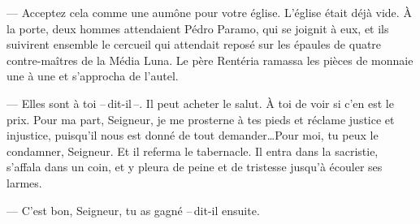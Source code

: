   --- Acceptez cela comme une aumône pour votre église.
\pend
%
\pstart
  L'église était déjà vide. À la porte, deux hommes attendaient Pédro Paramo, qui se joignit à eux, et ils suivirent ensemble le cercueil qui attendait reposé sur les épaules de quatre contre-maîtres de la Média Luna\footnotemark[1].
\pend
%
\pstart
  Le père Rentéria ramassa les pièces de monnaie une à une et s'approcha de l'autel.

  --- Elles sont à toi --\,dit-il\,--. Il peut acheter le salut. À toi de voir si c'en est le prix. Pour ma part, Seigneur, je me prosterne à tes pieds et réclame justice et injustice, puisqu'il nous est donné de tout demander\ldots Pour moi, tu peux le condamner, Seigneur.
\pend
%
\pstart
  Et il referma le tabernacle.
\pend
%
\pstart
  Il entra dans la sacristie, s'affala dans un coin, et y pleura de peine et de tristesse jusqu'à écouler ses larmes.

  --- C'est bon, Seigneur, tu as gagné --\,dit-il ensuite.
\pend
